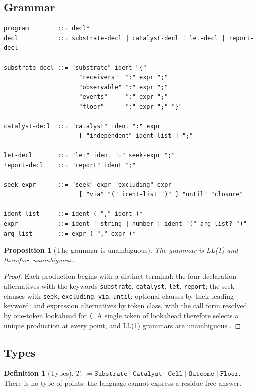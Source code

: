 \documentclass[11pt,a4paper]{article}
\theoremstyle{clstyle}
\newtheorem{proposition}[theorem]{Proposition}
\theoremstyle{definition}
\newtheorem{definition}[theorem]{Definition}
\theoremstyle{remark}
\begin{document}
\subsection{Grammar}

\begin{verbatim}
program        ::= decl*
decl           ::= substrate-decl | catalyst-decl | let-decl | report-decl

substrate-decl ::= "substrate" ident "{"
                     "receivers"  ":" expr ";"
                     "observable" ":" expr ";"
                     "events"     ":" expr ";"
                     "floor"      ":" expr ";" "}"

catalyst-decl  ::= "catalyst" ident ":" expr
                     [ "independent" ident-list ] ";"

let-decl       ::= "let" ident "=" seek-expr ";"
report-decl    ::= "report" ident ";"

seek-expr      ::= "seek" expr "excluding" expr
                     [ "via" "(" ident-list ")" ] "until" "closure"

ident-list     ::= ident ( "," ident )*
expr           ::= ident | string | number | ident "(" arg-list? ")"
arg-list       ::= expr ( "," expr )*
\end{verbatim}

\begin{proposition}[The grammar is unambiguous]
\label{prop:ll1}
The grammar is LL(1) and therefore unambiguous.
\end{proposition}

\begin{proof}
Each production begins with a distinct terminal: the four declaration
alternatives with the keywords \texttt{substrate}, \texttt{catalyst},
\texttt{let}, \texttt{report}; the seek clauses with \texttt{seek},
\texttt{excluding}, \texttt{via}, \texttt{until}; optional clauses by their
leading keyword; and expression alternatives by token class, with the call
form resolved by one-token lookahead for \texttt{(}. A single token of
lookahead therefore selects a unique production at every point, and LL(1)
grammars are unambiguous \citep{aho2006compilers}.
\end{proof}

\subsection{Types}

\begin{definition}[Types]
\label{def:types}
$T ::= \texttt{Substrate} \mid \texttt{Catalyst} \mid \texttt{Cell} \mid
\texttt{Outcome} \mid \texttt{Floor}$. There is no type of points: the
language cannot express a residue-free answer.
\end{definition}
\end{document}
